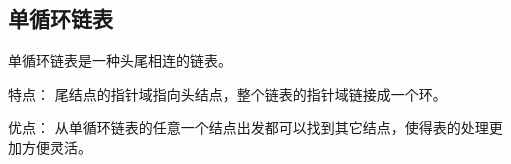 \subsection{单循环链表}

\begin{frame}\ft{\secname}
\begin{dingyi}[单循环链表]
单循环链表是一种头尾相连的链表。
\end{dingyi}
\vspace{0.1in}\pause 

\textcolor{acolor5}{特点：}
尾结点的指针域指向头结点，整个链表的指针域链接成一个环。
\vspace{0.1in}\pause 
 
\textcolor{acolor5}{优点：}
从单循环链表的任意一个结点出发都可以找到其它结点，使得表的处理更加方便灵活。
\end{frame}

